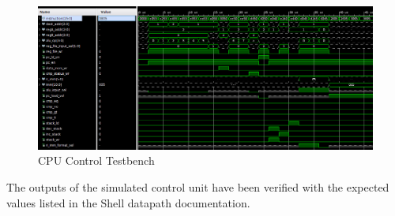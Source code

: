 \documentclass{article}
\begin{document}
\begin{par}
	\begin{figure}[H]
		\centering
		\includegraphics[width=7in]{img/CtrlUnitTB.png}
		\caption{CPU Control Testbench}
		\label{fig:cpuCtrlTB}
	\end{figure}

	The outputs of the simulated control unit have been verified with the expected values listed in the Shell datapath documentation. 
	
\end{par}

\newpage
\end{document}
